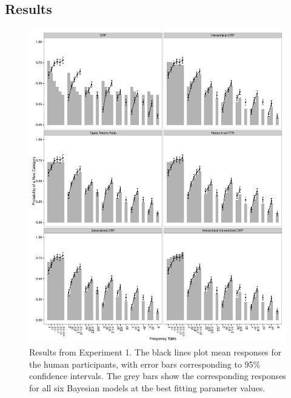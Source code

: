 \documentclass[doc]{apa6}
\begin{document}
\subsection{Results}



\begin{figure}[p]
\begin{center}
\includegraphics[scale=.55]{fit1.pdf}
\caption{Results from Experiment 1. The black lines plot mean responses for the human participants, with error bars corresponding to 95\% confidence intervals. The grey bars show the corresponding responses for all six Bayesian models at the best fitting parameter values.}
\label{fig:exp1}
\end{center}
\end{figure}
\end{document}

